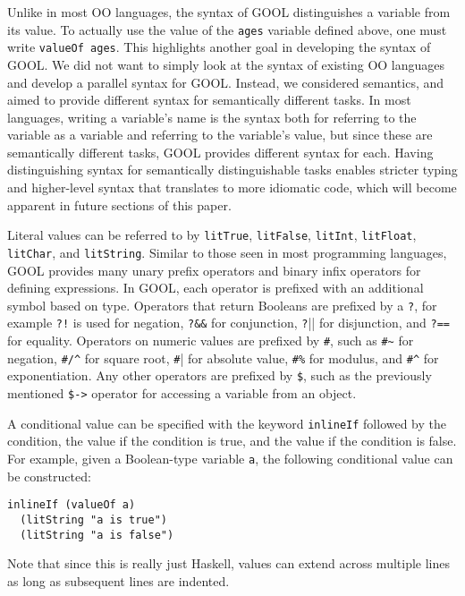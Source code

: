 \documentclass[sigplan,review,anonymous]{acmart}
\begin{document}
Unlike in most OO languages, the syntax of GOOL distinguishes a variable from 
its value. To actually use the value of the \verb|ages| variable defined above, 
one must write \verb|valueOf ages|. This highlights another goal in developing 
the syntax of GOOL. We did not want to simply look at the syntax of existing OO 
languages and develop a parallel syntax for GOOL. Instead, we considered 
semantics, and aimed to provide different syntax for semantically different 
tasks. In most languages, writing a variable's name is the syntax both for 
referring to the variable as a variable and referring to the variable's value, 
but since these are semantically different tasks, GOOL provides different 
syntax for each. Having distinguishing syntax for semantically distinguishable 
tasks enables stricter typing and higher-level syntax that translates to more 
idiomatic code, which will become apparent in future sections of this paper.

Literal values can be referred to by \verb|litTrue|, \verb|litFalse|, 
\verb|litInt|, \verb|litFloat|, \verb|litChar|, and \verb|litString|. Similar 
to those seen in most programming languages, GOOL provides many unary prefix 
operators and binary infix operators for defining expressions. In GOOL, each 
operator is prefixed with an additional symbol based on type. Operators that 
return Booleans are prefixed by a \verb|?|, for example \verb|?!| is used for 
negation, \verb|?&&| for conjunction, \verb|?||| for disjunction, and
\verb|?==| for equality. Operators on numeric values are prefixed by \verb|#|, 
such as \verb|#~| for negation, \verb|#/^| for square root, \verb|#|| for 
absolute value, \verb|#%| for modulus, and \verb|#^| for exponentiation. Any 
other operators are prefixed by \verb|$|, such as the previously mentioned 
\verb|$->| operator for accessing a variable from an object.

A conditional value can be specified with the keyword \verb|inlineIf| followed 
by the condition, the value if the condition is true, and the value if the 
condition is false. For example, given a Boolean-type variable \verb|a|, the 
following conditional value can be constructed:
\begin{lstlisting}
inlineIf (valueOf a) 
  (litString "a is true") 
  (litString "a is false")
\end{lstlisting}
Note that since this is really just Haskell, values can extend across multiple 
lines as long as subsequent lines are indented.
\end{document}
